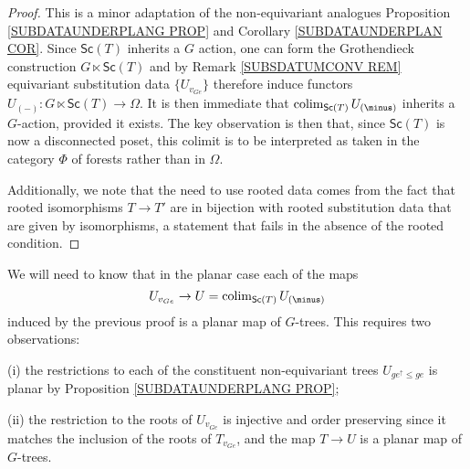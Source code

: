 \documentclass[a4paper,10pt]{article}%
\begin{document}
\begin{proof}
	This is a minor adaptation of the non-equivariant analogues Proposition \ref{SUBDATAUNDERPLANG PROP} and Corollary \ref{SUBDATAUNDERPLAN COR}.
	Since $\mathsf{Sc}(T)$ inherits a $G$ action, one can form the Grothendieck construction $G \ltimes \mathsf{Sc}(T)$ and by Remark \ref{SUBSDATUMCONV REM} equivariant substitution data $\{U_{v_{Ge}}\}$ therefore induce functors 
	$U_{(\minus)} \colon G \ltimes \mathsf{Sc}(T) \to \Omega$.
	It is then immediate that $\colim_{\mathsf{Sc}(T)} U_{(\minus)}$ inherits a $G$-action, provided it exists. 
	The key observation is then that, since $\mathsf{Sc}(T)$ is now a disconnected poset, this colimit is to be interpreted as taken in the category $\Phi$ of forests rather than in $\Omega$.
	
	Additionally, we note that the need to use rooted data comes from the fact that rooted isomorphisms $T \to T'$ are in bijection with rooted substitution data that are given by isomorphisms, a statement that fails in the absence of the rooted condition.
\end{proof}

\begin{remark} We will need to know that in the planar case each of the maps 
\[U_{v_{Ge}} \to U = \colim_{\mathsf{Sc}(T)}U_{(\minus)}\]
induced by the previous proof is a planar map of $G$-trees.
This requires two observations:
\begin{inparaenum}
	\item[(i)] the restrictions to each of the constituent non-equivariant trees $U_{ge^{\uparrow}\leq ge}$ is planar by Proposition \ref{SUBDATAUNDERPLANG PROP};
	\item[(ii)] the restriction to the roots of $U_{v_{Ge}}$ is injective and order preserving since it matches the inclusion of the roots of $T_{v_{Ge}}$, and the map $T \to U$ is a planar map of $G$-trees.
\end{inparaenum}
\end{remark}
\end{document}

